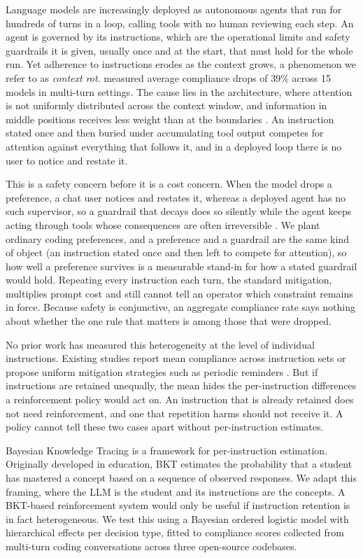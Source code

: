 \documentclass[a4paper]{llncs}
\begin{document}
Language models are increasingly deployed as autonomous agents that run
for hundreds of turns in a loop, calling tools with no human reviewing
each step. An agent is governed by its instructions, which are the
operational limits and safety guardrails it is given, usually once and at
the start, that must hold for the whole run. Yet adherence to instructions
erodes as the context grows, a phenomenon we refer to as \emph{context
rot}. \textcite{laban2025} measured average compliance drops of 39\%
across 15 models in multi-turn settings. The cause lies in the
architecture, where attention is not uniformly distributed across the
context window, and
information in middle positions receives less weight than at the
boundaries \parencite{liu2024, chowdhury2026}. An instruction stated once
and then buried under accumulating tool output competes for attention
against everything that follows it, and in a deployed loop there is no
user to notice and restate it.

This is a safety concern before it is a cost concern. When the model drops
a preference, a chat user notices and restates it, whereas a deployed agent
has no such supervisor, so a guardrail that decays does so silently while the
agent keeps acting through tools whose consequences are often
irreversible \parencite{mu2025}. We plant ordinary coding preferences,
and a preference and a guardrail are the same kind of object (an
instruction stated once and then left to compete for attention), so how
well a preference survives is a measurable stand-in for how a stated
guardrail would hold. Repeating every instruction each turn,
the standard mitigation, multiplies prompt cost and still cannot tell an
operator which constraint remains in force. Because safety is conjunctive,
an aggregate compliance rate says nothing about whether the one rule that
matters is among those that were dropped.

No prior work has measured this heterogeneity at the level of individual
instructions. Existing studies report mean compliance across instruction
sets \parencite{laban2025, he2024} or propose uniform mitigation
strategies such as periodic reminders \parencite{dongre2025}. But if
instructions are retained unequally, the mean hides the
per-instruction differences a reinforcement policy would act on. An instruction that is already retained does not need reinforcement, and
one that repetition harms should not receive it. A policy cannot tell
these two cases apart without per-instruction estimates.

Bayesian Knowledge Tracing \parencite{corbett1994} is a framework
for per-instruction estimation. Originally developed in education,
BKT estimates the probability that a student has mastered a concept
based on a sequence of observed responses. We adapt this framing, where the
LLM is the student and its instructions are the concepts. A BKT-based reinforcement system would only be useful if instruction
retention is in fact heterogeneous. We test this using a Bayesian ordered logistic model with
hierarchical effects per decision type, fitted to compliance scores
collected from multi-turn coding conversations across three
open-source codebases.
\end{document}
